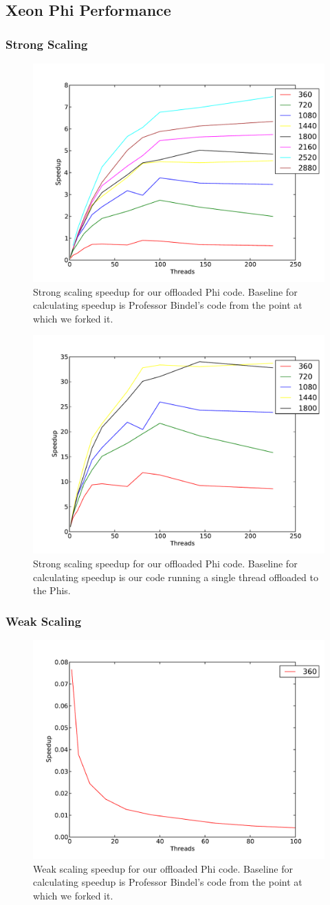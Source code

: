 \subsection{Xeon Phi Performance}

\subsubsection{Strong Scaling}
\begin{figure}[h!]
\includegraphics[width=0.5\linewidth]{mic_strong_bindel_baseline.pdf}
\caption{Strong scaling speedup for our offloaded Phi code. Baseline for calculating speedup is Professor Bindel's code from the point at which we forked it.}
\end{figure}

\begin{figure}[h!]
\includegraphics[width=0.5\linewidth]{mic_strong_mic_baseline.pdf}
\caption{Strong scaling speedup for our offloaded Phi code. Baseline for calculating speedup is our code running a single thread offloaded to the Phis.}
\end{figure}

\subsubsection{Weak Scaling}
\begin{figure}[h!]
\includegraphics[width=0.5\linewidth]{mic_weak_bindel_baseline.pdf}
\caption{Weak scaling speedup for our offloaded Phi code. Baseline for calculating speedup is Professor Bindel's code from the point at which we forked it.}
\end{figure}

